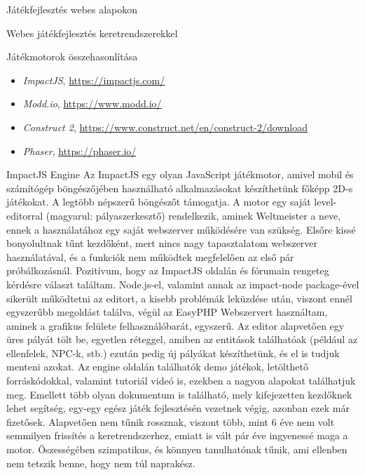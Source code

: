\begin{MyChapter}{Játékfejlesztés webes alapokon}
\begin{MySection}{Webes játékfejlesztés keretrendszerekkel}
\begin{MySubSection}{Játékmotorok összehasonlítása}
			\begin{itemize}
				\item \textit{ImpactJS}, \url{https://impactjs.com/}
				\item \textit{Modd.io}, \url{https://www.modd.io/}
				\item \textit{Construct 2}, \url{https://www.construct.net/en/construct-2/download}
				\item \textit{Phaser}, \url{https://phaser.io/}
			\end{itemize}
		\end{MySubSection}
	
		\begin{MySubSection}{ImpactJS Engine}
			Az ImpactJS egy olyan JavaScript játékmotor, amivel mobil és számítógép böngészőjében használható alkalmazásokat készíthetünk főképp 2D-s játékokat. A legtöbb népszerű böngészőt támogatja.
			A motor egy saját level-editorral (magyarul: pályaszerkesztő) rendelkezik, aminek Weltmeister a neve, ennek a használatához egy saját webszerver működésére van szükség. Elsőre kissé bonyolultnak tűnt kezdőként, mert nincs nagy tapasztalatom webszerver használatával, és a funkciók nem működtek megfelelően az első pár próbálkozásnál. Pozitívum, hogy az ImpactJS oldalán és fórumain rengeteg kérdésre választ találtam. Node.js-el, valamint annak az impact-node package-ével sikerült működtetni az editort, a kisebb problémák leküzdése után, viszont ennél egyszerűbb megoldást találva, végül az EasyPHP Webszervert használtam, aminek a grafikus felülete felhasználóbarát, egyszerű. Az editor alapvetően egy üres pályát tölt be, egyetlen réteggel, amiben az entitások találhatóak (például az ellenfelek, NPC-k, stb.) ezután pedig új pályákat készíthetünk, és el is tudjuk menteni azokat. Az engine oldalán találhatók demo játékok, letölthető forráskódokkal, valamint tutoriál videó is, ezekben a nagyon alapokat találhatjuk meg. Emellett több olyan dokumentum is található, mely kifejezetten kezdőknek lehet segítség, egy-egy egész játék fejlesztésén vezetnek végig, azonban ezek már fizetősek. Alapvetően nem tűnik rossznak, viszont több, mint 6 éve nem volt semmilyen frissítés a keretrendszerhez, emiatt is vált pár éve ingyenessé maga a motor. Öszességében szimpatikus, és könnyen tanulhatónak tűnik, ami ellenben nem tetszik benne, hogy nem túl naprakész.
			\cite{impactjs}
		\end{MySubSection}
			

\end{MySection}
\end{MyChapter}
